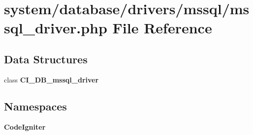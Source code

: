 \section{system/database/drivers/mssql/mssql\-\_\-driver.php File Reference}
\label{mssql__driver_8php}
\subsection*{Data Structures}
\begin{DoxyCompactItemize}
\item 
class {\bf C\-I\-\_\-\-D\-B\-\_\-mssql\-\_\-driver}
\end{DoxyCompactItemize}
\subsection*{Namespaces}
\begin{DoxyCompactItemize}
\item 
{\bf Code\-Igniter}
\end{DoxyCompactItemize}
